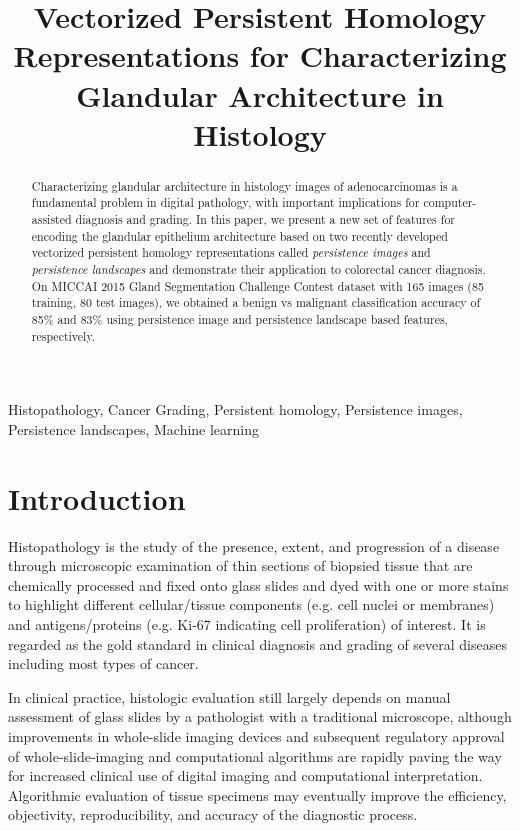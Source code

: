 \documentclass{article}
\title{Vectorized Persistent Homology Representations for Characterizing Glandular Architecture in Histology}
\begin{document}
%
\maketitle
%
\begin{abstract}
Characterizing glandular architecture in histology images of adenocarcinomas is a fundamental problem in digital pathology, with important implications for computer-assisted diagnosis and grading. In this paper, we present a new set of features for encoding the glandular epithelium architecture based on two recently developed vectorized persistent homology representations called \emph{persistence images} and \emph{persistence landscapes} and demonstrate their application to colorectal cancer diagnosis. On MICCAI 2015 Gland Segmentation Challenge Contest dataset with 165 images (85 training, 80 test images), we obtained a benign vs malignant classification accuracy of 85\% and 83\% using persistence image and persistence landscape based features, respectively.  
\end{abstract}
%
\begin{keywords}
Histopathology, Cancer Grading, Persistent homology, Persistence images, Persistence landscapes, Machine learning
\end{keywords}
%
\vspace{-0.4cm}
\section{Introduction}
\label{sec:intro}
Histopathology is the study of the presence, extent, and progression of a disease through microscopic examination of thin sections of biopsied tissue that are chemically processed and fixed onto glass slides and dyed with one or more stains to highlight different cellular/tissue components (e.g. cell nuclei or membranes) and antigens/proteins (e.g. Ki-67 indicating cell proliferation) of interest. It is regarded as the gold standard in clinical diagnosis and grading of several diseases including most types of cancer. 

In clinical practice, histologic evaluation still largely depends on manual assessment of glass slides by a pathologist with a traditional microscope, although improvements in whole-slide imaging devices and subsequent regulatory approval of whole-slide-imaging and computational algorithms are rapidly paving the way for increased clinical use of digital imaging and computational interpretation. Algorithmic evaluation of tissue specimens may eventually improve the efficiency, objectivity, reproducibility, and accuracy of the diagnostic process.
\end{document}
